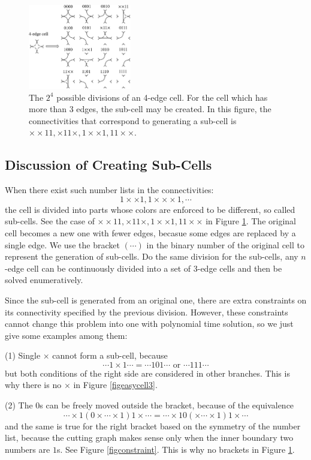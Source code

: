\documentclass[journal]{IEEEtran}
\begin{document}
\begin{figure}[t]
\centering
\includegraphics[width = 0.4\textwidth]{easycell/cell4}
\caption{The $2^4$ possible divisions of an 4-edge cell. For the cell which has more than 3 edges, the sub-cell may be created. In this figure, the connectivities that correspond to generating a sub-cell is $\times\times11, \times11\times, 1\times\times1, 11\times\times$. }\label{figeasycell4}
\end{figure}

\subsection{Discussion of Creating Sub-Cells}\label{subsectiondiscussion}
When there exist such number lists in the connectivities: 
$$1\times\times1, 1\times\times\times1, \cdots$$
the cell is divided into parts whose colors are enforced to be different, so called sub-cells.
See the case of $\times\times11, \times11\times, 1\times\times1, 11\times\times$ in Figure \ref{figeasycell4}. The original cell becomes a new one with fewer edges, becasue some edges are replaced by a single edge. We use the bracket $(\cdots)$ in the binary number of the original cell to represent the generation of sub-cells.
Do the same division for the sub-cells, any $n$-edge cell can be continuously divided into a set of 3-edge cells and then be solved enumeratively. 

Since the sub-cell is generated from an original one, there are extra constraints on its connectivity specified by the previous division. However, these constraints cannot change this problem into one with polynomial time solution, so we just give some examples among them:

(1) Single $\times$ cannot form a sub-cell, because 
$$\cdots 1\times 1\cdots = \cdots 101\cdots \mbox{ or }\cdots 111\cdots$$
but both conditions of the right side are considered in other branches. This is why there is no $\times$ in Figure \ref{figeasycell3}.  

(2) The $0$s can be freely moved outside the bracket, because of the equivalence 
$$\cdots\times1(0\times\cdots\times1)1\times\cdots = \cdots\times10(\times\cdots\times1)1\times\cdots$$
and the same is true for the right bracket based on the symmetry of the number list, because the cutting graph makes sense only when the inner boundary two numbers are $1$s. See Figure \ref{figconstraint}. This is why no brackets in Figure \ref{figeasycell4}.
\end{document}
